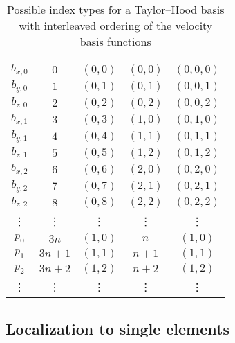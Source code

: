 \documentclass[a4paper,10pt,headings=normal,bibliography=totoc]{scrartcl}
\begin{document}
\begin{table}
 \begin{center}
 \begin{tabular}{c|c|c|c|c}
 \hline \\
  $b_{x,0}$  & $0$    & $(0,0)$ & $(0,0)$ & $(0,0,0)$ \\
  $b_{y,0}$  & $1$    & $(0,1)$ & $(0,1)$ & $(0,0,1)$ \\
  $b_{z,0}$  & $2$    & $(0,2)$ & $(0,2)$ & $(0,0,2)$ \\
  $b_{x,1}$  & $3$    & $(0,3)$ & $(1,0)$ & $(0,1,0)$ \\
  $b_{y,1}$  & $4$    & $(0,4)$ & $(1,1)$ & $(0,1,1)$ \\
  $b_{z,1}$  & $5$    & $(0,5)$ & $(1,2)$ & $(0,1,2)$ \\
  $b_{x,2}$  & $6$    & $(0,6)$ & $(2,0)$ & $(0,2,0)$ \\
  $b_{y,2}$  & $7$    & $(0,7)$ & $(2,1)$ & $(0,2,1)$ \\
  $b_{z,2}$  & $8$    & $(0,8)$ & $(2,2)$ & $(0,2,2)$ \\
    \vdots   & \vdots & \vdots  & \vdots  & \vdots  \\
  $p_0$      & $3n$   & $(1,0)$ & $n$ & $(1,0)$ \\
  $p_1$      & $3n+1$ & $(1,1)$ & $n+1$ & $(1,1)$ \\
  $p_2$      & $3n+2$ & $(1,2)$ & $n+2$ & $(1,2)$ \\
    \vdots   & \vdots & \vdots  & \vdots  & \vdots
 \end{tabular}
 \end{center}
 \caption{Possible index types for a Taylor--Hood basis with interleaved ordering of the velocity basis functions
 \label{tbl:dune_functions:th_multiindices_interleaved}
 }
\end{table}

\subsection{Localization to single elements}
\end{document}
